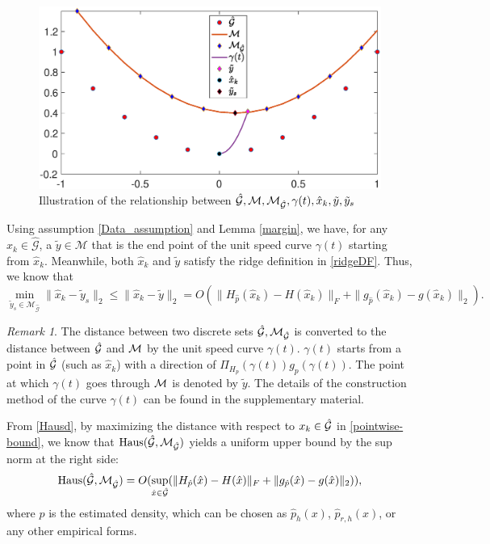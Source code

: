 \documentclass[aos,preprint]{imsart}
\theoremstyle{remark}
\newtheorem*{remark}{Remark}
\begin{document}
\begin{figure}[htbp] %
   \centering
   \includegraphics[width=0.8\linewidth]{demoMG.eps} 
   \caption{Illustration of the relationship  between $\hat{\cal G},{\cal M}, {\cal M}_{\cal \hat{G}}, \gamma(t),\hat{x}_k, \tilde{y}, \tilde{y}_s$}
   \label{fig:example:3}
\end{figure}


Using assumption \ref{Data_assumption} and Lemma \ref{margin}, we have, for any $\hat{x}_k\in \hat{\mathcal G}$, a $\tilde{y}\in {\mathcal M}$ that is the end point of the unit speed curve $\gamma(t)$ starting from $\hat{x}_k$. Meanwhile, both  $\hat{x}_k$ and $\tilde{y}$ satisfy the ridge definition in \eqref{ridgeDF}. 
Thus, we know that 
\begin{equation}\label{pointwise-bound}
\min_{\tilde{y}_s\in {\mathcal M}_{\hat{\mathcal G}}}\|\hat{x}_k-\tilde{y}_s\|_2 \leq \|\hat{x}_k-\tilde{y}\|_2 = O (\|H_{\hat{p}}(\hat{x}_k)-H(\hat{x}_k)\|_F+\|g_{\hat{p}}(\hat{x}_k)-g(\hat{x}_k)\|_2  ).
\end{equation}
\begin{remark}
The distance between two discrete sets $\hat{\cal G}, {\cal M}_{\hat{\cal G}}$ is converted to the distance between $\hat{\cal G}$ and ${\cal M}$ by the unit speed curve $\gamma(t)$. $\gamma(t)$ starts from a point in $\hat{\cal G}$ (such as $\hat{x}_k$) with a direction of $\Pi_{H_p}(\gamma(t)) g_{p}(\gamma(t))$. The point at which $\gamma(t)$ goes through $\cal M$ is denoted by $\tilde{y}$. The details of the construction method of the curve $\gamma(t)$ can be found in the supplementary material.
\end{remark}
From \eqref{Hausd}, by maximizing the distance with respect to $x_k\in 
\hat{\cal G}$ in \eqref{pointwise-bound}, we know that ${\rm Haus}({\mathcal {\hat{G}}}, {\mathcal M}_{\mathcal {\hat{G}}})$ yields a uniform upper bound by the sup norm at the right side:
\begin{equation}\label{Hausmargin}
{\rm Haus}({\hat{\mathcal G}}, {\mathcal M}_{\hat{\mathcal G}}) = O (\sup_{\hat{x}\in\hat{\cal G}}( \|H_{\hat{p}}(\hat{x})-H(\hat{x})\|_F+\|g_{\hat{p}}(\hat{x})-g(\hat{x})\|_2 ) ),
\end{equation}
where $\hat{p}$ is the estimated density, which can be chosen as $\hat{p}_h(x)$, $\hat{p}_{r,h}(x)$, or any other empirical forms.
\end{document}
